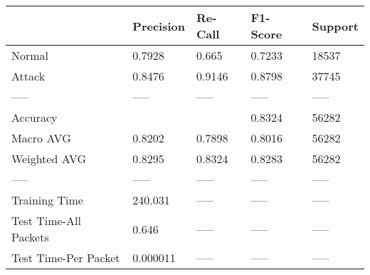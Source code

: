 \begin{tabular}{lllll}
\toprule
{} & Precision & Re-Call & F1-Score & Support \\
\midrule
Normal                &    0.7928 &   0.665 &   0.7233 &   18537 \\
Attack                &    0.8476 &  0.9146 &   0.8798 &   37745 \\
-----                 &     ----- &   ----- &    ----- &   ----- \\
Accuracy              &           &         &   0.8324 &   56282 \\
Macro AVG             &    0.8202 &  0.7898 &   0.8016 &   56282 \\
Weighted AVG          &    0.8295 &  0.8324 &   0.8283 &   56282 \\
-----                 &     ----- &   ----- &    ----- &   ----- \\
Training Time         &   240.031 &   ----- &    ----- &   ----- \\
Test Time-All Packets &     0.646 &   ----- &    ----- &   ----- \\
Test Time-Per Packet  &  0.000011 &   ----- &    ----- &   ----- \\
\bottomrule
\end{tabular}
